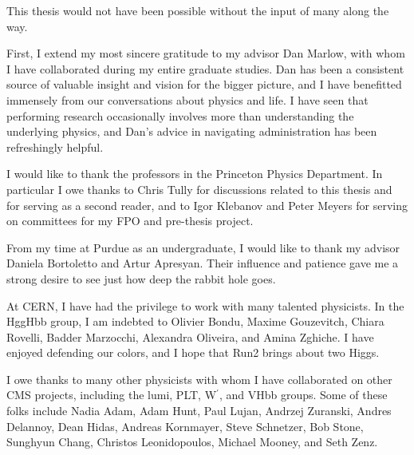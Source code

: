 This thesis would not have been possible without the input of many along the way.

First, I extend my most sincere gratitude to my advisor Dan Marlow, with whom I have collaborated
during my entire graduate studies.
Dan has been a consistent source of valuable insight and vision for the bigger picture, and
I have benefitted immensely from our conversations about physics and life.
I have seen that performing research occasionally involves
more than understanding the underlying physics,
and Dan's advice in navigating administration has been refreshingly helpful.

I would like to thank the professors in the Princeton Physics Department. In particular
I owe thanks to Chris Tully for discussions related to this thesis and for serving as a second reader,
and to Igor Klebanov and Peter Meyers for serving on committees for my FPO and pre-thesis project.

From my time at Purdue as an undergraduate, I would like to thank my advisor Daniela Bortoletto and
Artur Apresyan. Their influence and patience gave me a strong desire to
see just how deep the rabbit hole goes.

At CERN, I have had the privilege to work with many talented physicists. In the HggHbb group,
I am indebted to
Olivier Bondu, Maxime Gouzevitch, Chiara Rovelli, Badder Marzocchi, Alexandra Oliveira, and
Amina Zghiche. I have enjoyed defending our colors,
and I hope that Run2 brings about two Higgs.

I owe thanks to many other physicists with whom I have collaborated on other CMS projects, including the
lumi, PLT, W$^\prime$, and VHbb groups. Some of these folks include
Nadia Adam, Adam Hunt, Paul Lujan, Andrzej Zuranski,
Andres Delannoy, Dean Hidas, Andreas Kornmayer, Steve Schnetzer, Bob Stone, 
Sunghyun Chang, Christos Leonidopoulos, Michael Mooney, and Seth Zenz.

